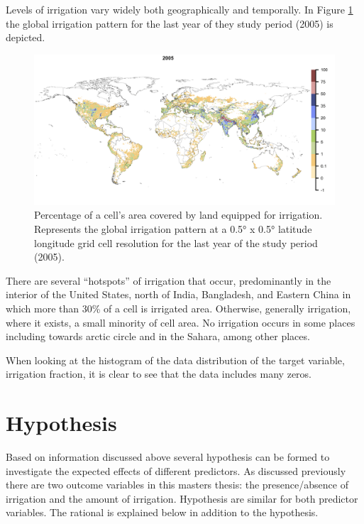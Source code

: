 \documentclass[12pt,twoside]{reedthesis}
\begin{document}
Levels of irrigation vary widely both geographically and temporally. In Figure \ref{fig:irrfrac2005} the global irrigation pattern for the last year of they study period (2005) is depicted.
\begin{figure}
\includegraphics[width=1000px]{figure/irrfrac2005} \caption{Percentage of a cell's area covered by land equipped for irrigation. Represents the global irrigation pattern at a 0.5° x 0.5° latitude longitude grid cell resolution for the last year of the study period (2005).}\label{fig:irrfrac2005}
\end{figure}
There are several ``hotspots'' of irrigation that occur, predominantly in the interior of the United States, north of India, Bangladesh, and Eastern China in which more than 30\% of a cell is irrigated area. Otherwise, generally irrigation, where it exists, a small minority of cell area. No irrigation occurs in some places including towards arctic circle and in the Sahara, among other places.

When looking at the histogram of the data distribution of the target variable, irrigation fraction, it is clear to see that the data includes many zeros.

\hypertarget{hypothesis}{%
\section{Hypothesis}\label{hypothesis}}

Based on information discussed above several hypothesis can be formed to investigate the expected effects of different predictors. As discussed previously there are two outcome variables in this masters thesis: the presence/absence of irrigation and the amount of irrigation. Hypothesis are similar for both predictor variables. The rational is explained below in addition to the hypothesis.
\end{document}
